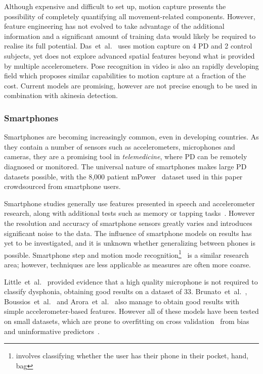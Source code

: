 \documentclass[12pt, twoside]{book}
\renewcommand\emph[1]{\textit{\color{USred}{#1}}}
\begin{document}
Although expensive and difficult to set up, motion capture presents the possibility of completely quantifying all movement-related components. However, feature engineering has not evolved to take advantage of the additional information and a significant amount of training data would likely be required to realise its full potential. Das~et~al.~\cite{das2011quantitative} uses motion capture on 4 PD and 2 control subjects, yet does not explore advanced spatial features beyond what is provided by multiple accelerometers. Pose recognition in video is also an rapidly developing field which proposes similar capabilities to motion capture at a fraction of the cost. Current models are promising, however are not precise enough to be used in combination with akinesia detection.

\subsubsection{Smartphones}
Smartphones are becoming increasingly common, even in developing countries. As they contain a number of sensors such as accelerometers, microphones and cameras, they are a promising tool in \textit{telemedicine}, where PD can be remotely diagnosed or monitored. The universal nature of smartphones makes large PD datasets possible, with the 8,000 patient mPower~\cite{mpower} dataset used in this paper crowdsourced from smartphone users.

Smartphone studies generally use features presented in speech and accelerometer research, along with additional tests such as memory or tapping tasks~\cite{tapping}. However the resolution and accuracy of smartphone sensors greatly varies and introduces significant noise to the data. The influence of smartphone models on results has yet to be investigated, and it is unknown whether generalizing between phones is possible. Smartphone step and motion mode recognition\footnote{\emph{Motion mode recognition} involves classifying whether the user has their phone in their pocket, hand, bag  }~\cite{motionmoderecognition, li2010multimodal} is a similar research area; however, techniques are less applicable as measures are often more coarse.


Little~et~al.~\cite{splittledysphonia2009} provided evidence that a high quality microphone is not required to classify dysphonia, obtaining good results on a dataset of 33. Brunato~et~al.~\cite{smartphonemjfoxlion}, Boussios~et~al.~\cite{smartphonemjfoxB} and Arora~et~al.~\cite{arora2014high} also manage to obtain good results with simple accelerometer-based features. However all of these models have been tested on small datasets, which are prone to overfitting on cross validation~\cite{overfittingcv} from bias and uninformative predictors~\cite{freedmanparadox}. 
\end{document}
